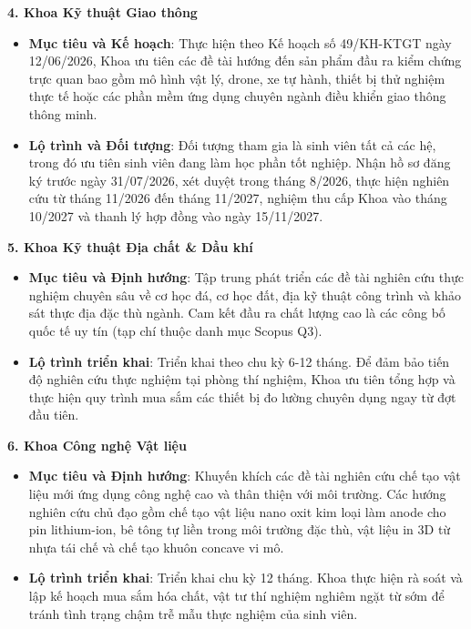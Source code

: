 \documentclass[11pt,a4paper]{article}
\providecommand{\tightlist}{%
  \setlength{\itemsep}{0pt}\setlength{\parskip}{0pt}}
\begin{document}
\textbf{4. Khoa Kỹ thuật Giao thông}

\begin{itemize}
\tightlist
\item
  \textbf{Mục tiêu và Kế hoạch}: Thực hiện theo Kế hoạch số 49/KH-KTGT
  ngày 12/06/2026, Khoa ưu tiên các đề tài hướng đến sản phẩm đầu ra
  kiểm chứng trực quan bao gồm mô hình vật lý, drone, xe tự hành, thiết
  bị thử nghiệm thực tế hoặc các phần mềm ứng dụng chuyên ngành điều
  khiển giao thông thông minh.
\item
  \textbf{Lộ trình và Đối tượng}: Đối tượng tham gia là sinh viên tất cả
  các hệ, trong đó ưu tiên sinh viên đang làm học phần tốt nghiệp. Nhận
  hồ sơ đăng ký trước ngày 31/07/2026, xét duyệt trong tháng 8/2026,
  thực hiện nghiên cứu từ tháng 11/2026 đến tháng 11/2027, nghiệm thu
  cấp Khoa vào tháng 10/2027 và thanh lý hợp đồng vào ngày 15/11/2027.
\end{itemize}

\textbf{5. Khoa Kỹ thuật Địa chất \& Dầu khí}

\begin{itemize}
\tightlist
\item
  \textbf{Mục tiêu và Định hướng}: Tập trung phát triển các đề tài
  nghiên cứu thực nghiệm chuyên sâu về cơ học đá, cơ học đất, địa kỹ
  thuật công trình và khảo sát thực địa đặc thù ngành. Cam kết đầu ra
  chất lượng cao là các công bố quốc tế uy tín (tạp chí thuộc danh mục
  Scopus Q3).
\item
  \textbf{Lộ trình triển khai}: Triển khai theo chu kỳ 6-12 tháng. Để
  đảm bảo tiến độ nghiên cứu thực nghiệm tại phòng thí nghiệm, Khoa ưu
  tiên tổng hợp và thực hiện quy trình mua sắm các thiết bị đo lường
  chuyên dụng ngay từ đợt đầu tiên.
\end{itemize}

\textbf{6. Khoa Công nghệ Vật liệu}

\begin{itemize}
\tightlist
\item
  \textbf{Mục tiêu và Định hướng}: Khuyến khích các đề tài nghiên cứu
  chế tạo vật liệu mới ứng dụng công nghệ cao và thân thiện với môi
  trường. Các hướng nghiên cứu chủ đạo gồm chế tạo vật liệu nano oxit
  kim loại làm anode cho pin lithium-ion, bê tông tự liền trong môi
  trường đặc thù, vật liệu in 3D từ nhựa tái chế và chế tạo khuôn
  concave vi mô.
\item
  \textbf{Lộ trình triển khai}: Triển khai chu kỳ 12 tháng. Khoa thực
  hiện rà soát và lập kế hoạch mua sắm hóa chất, vật tư thí nghiệm
  nghiêm ngặt từ sớm để tránh tình trạng chậm trễ mẫu thực nghiệm của
  sinh viên.
\end{itemize}
\end{document}
